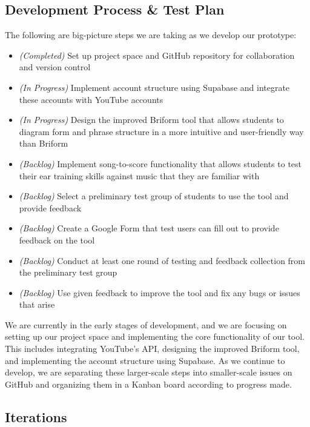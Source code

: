\documentclass[12pt, letterpaper]{article}
\begin{document}
\subsection*{Development Process \& Test Plan}
The following are big-picture steps we are taking as we develop our prototype:
\begin{itemize}
	\item[] \textit{(Completed)} Set up project space and GitHub repository for collaboration and version control
	\item[] \textit{(In Progress)} Implement account structure using Supabase and integrate these accounts with YouTube accounts
	\item[] \textit{(In Progress)} Design the improved Briform tool that allows students to diagram form and phrase structure in a more intuitive and user-friendly way than Briform
	\item[] \textit{(Backlog)} Implement song-to-score functionality that allows students to test their ear training skills against music that they are familiar with
	\item[] \textit{(Backlog)} Select a preliminary test group of students to use the tool and provide feedback
	\item[] \textit{(Backlog)} Create a Google Form that test users can fill out to provide feedback on the tool
	\item[] \textit{(Backlog)} Conduct at least one round of testing and feedback collection from the preliminary test group
	\item[] \textit{(Backlog)} Use given feedback to improve the tool and fix any bugs or issues that arise
\end{itemize}

We are currently in the early stages of development, and we are focusing on setting up our project space and implementing the core functionality of our tool.  This includes integrating YouTube's API, designing the improved Briform tool, and implementing the account structure using Supabase.  As we continue to develop, we are separating these larger-scale steps into smaller-scale issues on GitHub and organizing them in a Kanban board according to progress made.

\subsection*{Iterations}
\end{document}

